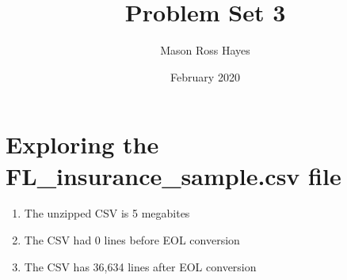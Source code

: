 \documentclass{article}
\title{Problem Set 3}
\author{Mason Ross Hayes}
\date{February 2020}
\begin{document}
\maketitle

\section{Exploring the FL\_insurance\_sample.csv file}

\begin{enumerate}
    \item The unzipped CSV is 5 megabites
    \item The CSV had 0 lines before EOL conversion
    \item The CSV has 36,634 lines after EOL conversion
\end{enumerate}
\end{document}
